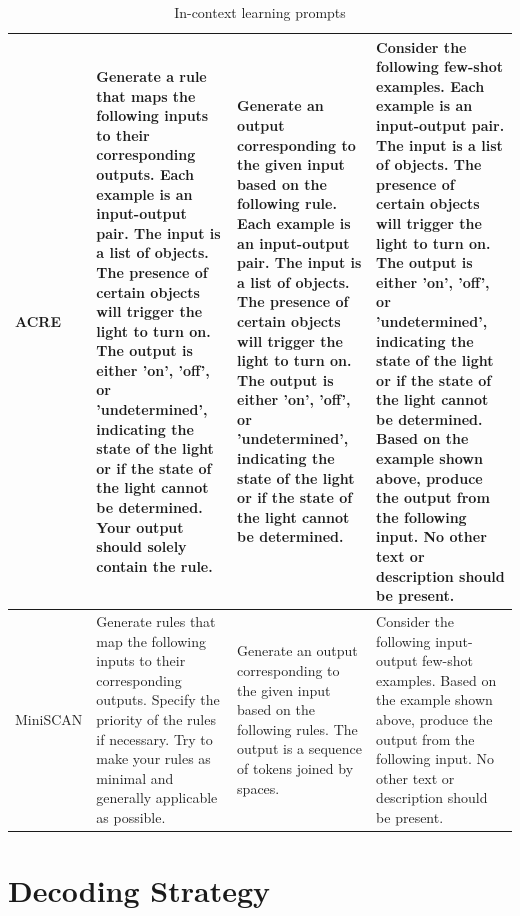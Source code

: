 \begin{table}
{\begin{tabular}{p{2cm}|p{4cm}|p{4cm}|p{4cm}}
ACRE & Generate a rule that maps the following inputs to their corresponding outputs. Each example is an input-output pair. The input is a list of objects. The presence of certain objects will trigger the light to turn on. The output is either 'on', 'off', or 'undetermined', indicating the state of the light or if the state of the light cannot be determined. Your output should solely contain the rule. & Generate an output corresponding to the given input based on the following rule. Each example is an input-output pair. The input is a list of objects. The presence of certain objects will trigger the light to turn on. The output is either 'on', 'off', or 'undetermined', indicating the state of the light or if the state of the light cannot be determined. & Consider the following few-shot examples. Each example is an input-output pair. The input is a list of objects. The presence of certain objects will trigger the light to turn on. The output is either 'on', 'off', or 'undetermined', indicating the state of the light or if the state of the light cannot be determined. Based on the example shown above, produce the output from the following input. No other text or description should be present. \\ \midrule
MiniSCAN & Generate rules that map the following inputs to their corresponding outputs. Specify the priority of the rules if necessary. Try to make your rules as minimal and generally applicable as possible. & Generate an output corresponding to the given input based on the following rules. The output is a sequence of tokens joined by spaces. & Consider the following input-output few-shot examples. Based on the example shown above, produce the output from the following input. No other text or description should be present. \\ 
 \bottomrule
\end{tabular}
}
\caption{In-context learning prompts}
\label{tab:prompts}
\end{table}

\section{Decoding Strategy}
\label{app:temperature}


